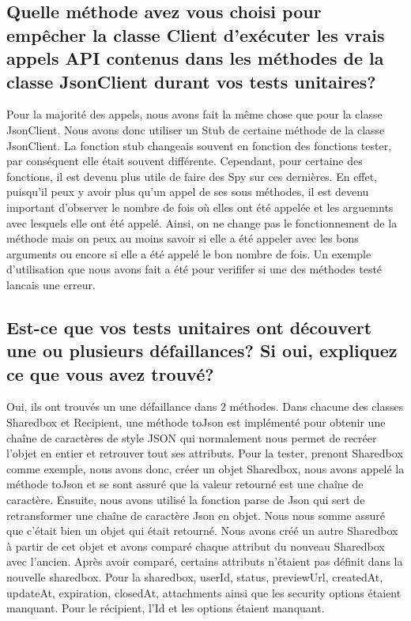 \documentclass{article}
\begin{document}
\subsection*{Quelle méthode avez vous choisi pour empêcher la classe Client d’exécuter les
  vrais appels API contenus dans les méthodes de la classe JsonClient durant
  vos tests unitaires?}
Pour la majorité des appels, nous avons fait la même chose que pour la classe JsonClient.
Nous avons donc utiliser un Stub de certaine méthode de la classe JsonClient.
La fonction stub changeais souvent en fonction des fonctions tester, par conséquent elle était souvent différente.
Cependant, pour certaine des fonctions, il est devenu plus utile de faire des Spy sur ces dernières.
En effet, puisqu'il peux y avoir plus qu'un appel de ses sous méthodes, il est devenu important d'observer le nombre de fois où elles ont été appelée et les arguemnts avec lesquels elle ont été appelé.
Ainsi, on ne change pas le fonctionnement de la méthode mais on peux au moins savoir si elle a été appeler avec les bons arguments ou encore si elle a été appelé le bon nombre de fois.
Un exemple d'utilisation que nous avons fait a été pour verififer si une des méthodes testé lancais une erreur.
\subsection*{Est-ce que vos tests unitaires ont découvert une ou plusieurs défaillances? Si oui,
  expliquez ce que vous avez trouvé?}
Oui, ils ont trouvés un une défaillance dans 2 méthodes.
Dans chacune des classes Sharedbox et Recipient, une méthode toJson est implémenté pour obtenir une chaîne de caractères de style JSON qui normalement nous permet de recréer l'objet en entier et retrouver tout ses attributs.
Pour la tester, prenont Sharedbox comme exemple, nous avons donc, créer un objet Sharedbox, nous avons appelé la méthode toJson et se sont assuré que la valeur retourné est une chaîne de caractère.
Ensuite, nous avons utilisé la fonction parse de Json qui sert de retransformer une chaîne de caractère Json en objet.
Nous nous somme assuré que c'était bien un objet qui était retourné.
Nous avons créé un autre Sharedbox à partir de cet objet et avons comparé chaque attribut du nouveau Sharedbox avec l'ancien.
Après avoir comparé, certains attributs n'étaient pas définit dans la nouvelle sharedbox.
Pour la sharedbox, userId, status, previewUrl, createdAt, updateAt, expiration, closedAt, attachments ainsi que les security options étaient manquant.
Pour le récipient, l'Id et les options étaient manquant.
\end{document}
